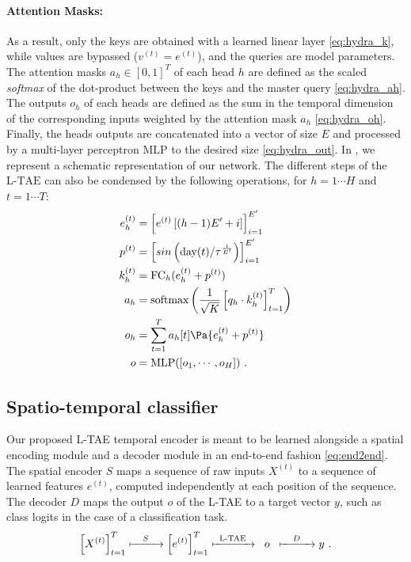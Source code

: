 \documentclass[runningheads]{llncs}
\newcommand{\LTAE}{\text{L-TAE}}
\newcommand{\MLP}{\text{MLP}}
\begin{document}
\paragraph{Attention Masks:}
As a result, only the keys are obtained with a learned linear layer \eqref{eq:hydra_k}, while values are bypassed ($v^{(t)} = e^{(t)}$), and the queries are model parameters. The attention masks $a_h \in [0,1]^T$ of each head $h$ are defined as the scaled \emph{softmax} of the dot-product between the keys and the master query \eqref{eq:hydra_ah}.
The outputs $o_h$ of each heads are defined as the sum in the temporal dimension of the corresponding inputs weighted by the attention mask $a_h$ \eqref{eq:hydra_oh}. Finally, the heads outputs are concatenated into a vector of size $E$ and processed by a multi-layer perceptron $\MLP$ to the desired size \eqref{eq:hydra_out}.
In , we represent a schematic representation of our network. The different steps of the $\LTAE$  can also be condensed by the following operations, for $h = 1 \cdots H$ and $t = 1 \cdots T$:
\begin{align}
        e^{(t)}_h &=\left[e^{(t)}\left[(h-1)E' +i\right]\right]_{i=1}^{ E'} \label{eq:hydra_split}\\
        p^{(t)} &= \left[sin\left(\text{day}(t)/\tau^{\frac{i}{E'}}\right)\right]_{i=1}^{E'}\label{eq:hydra_pos}\\
        k^{(t)}_h &= \text{FC}_h (e^{(t)}_h + p^{(t)} )\label{eq:hydra_k}\\
        a_h &= \text{softmax} \left(  \frac{1}{\sqrt{K}}\left[q_{h} \cdot k^{(t)}_{h}\right]_{t=1}^T   \right) \label{eq:hydra_ah}\\
        o_{h} &=  \sum_{t = 1}^{T} a_h[t] \Pa{e^{(t)}_h + p^{(t)}} \label{eq:hydra_oh}\\
          o &= \MLP([o_{1}, \cdots, o_{H}])~. \label{eq:hydra_out}
\end{align}
\subsection{Spatio-temporal classifier}
Our proposed L-TAE temporal encoder is meant to be learned alongside a spatial encoding module and a decoder module in an end-to-end fashion \eqref{eq:end2end}.
The spatial encoder $S$ maps a sequence of raw inputs $X^{(t)}$ to a sequence of learned features $e^{(t)}$, computed independently at each position of the sequence.
The decoder $D$ maps the output $o$ of the L-TAE to a target vector $y$, such as class logits in the case of a classification task.
\begin{equation}
  \left[X^{(t)}\right]_{t=1}^{T} 
  \xmapsto{\quad S \quad }
  \left[e^{(t)}\right]_{t=1}^{T}
  \xmapsto{\;\; \LTAE \;\;}
  \;\;o \;\;
  \xmapsto{\quad D \quad }
  y~.
  \label{eq:end2end}
\end{equation}
%
\end{document}
